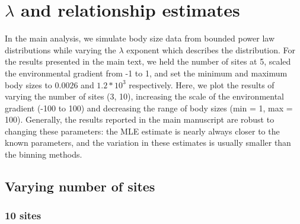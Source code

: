 \documentclass[
]{article}
\newcommand{\beginsupplement}{ \setcounter{table}{0} \renewcommand{\thetable}{S\arabic{table}} \setcounter{figure}{0} \renewcommand{\thefigure}{S\arabic{figure}}}
\begin{document}
\beginsupplement

\hypertarget{lambda-and-relationship-estimates}{%
\section{\texorpdfstring{\(\lambda\) and relationship
estimates}{\textbackslash lambda and relationship estimates}}\label{lambda-and-relationship-estimates}}

In the main analysis, we simulate body size data from bounded power law
distributions while varying the \(\lambda\) exponent which describes the
distribution. For the results presented in the main text, we held the
number of sites at 5, scaled the environmental gradient from -1 to 1,
and set the minimum and maximum body sizes to \(0.0026\) and
\(1.2 *10^3\) respectively. Here, we plot the results of varying the
number of sites (3, 10), increasing the scale of the environmental
gradient (-100 to 100) and decreasing the range of body sizes (min = 1,
max = 100). Generally, the results reported in the main manuscript are
robust to changing these parameters: the MLE estimate is nearly always
closer to the known parameters, and the variation in these estimates is
usually smaller than the binning methods.

\hypertarget{varying-number-of-sites}{%
\subsection{Varying number of sites}\label{varying-number-of-sites}}

\hypertarget{sites}{%
\subsubsection{10 sites}\label{sites}}
\end{document}
